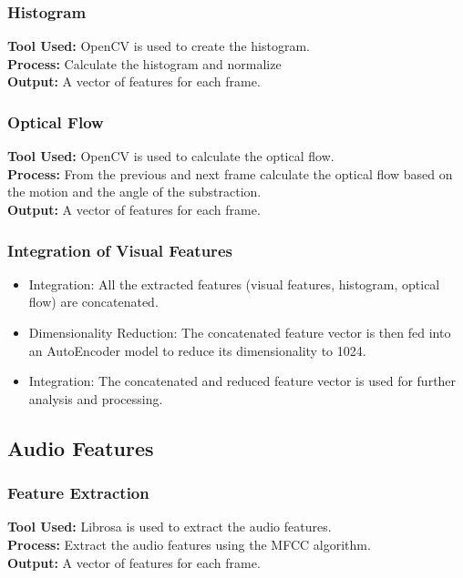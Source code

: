 \documentclass[conference]{IEEEtran}
\begin{document}
\subsubsection*{Histogram}
    \textbf{Tool Used:} OpenCV is used to create the histogram.\\
    \textbf{Process:} Calculate the histogram and normalize\\
    \textbf{Output:} A vector of features for each frame.
\\
\subsubsection*{Optical Flow}
    \textbf{Tool Used:} OpenCV is used to calculate the optical flow.\\
    \textbf{Process:} From the previous and next frame calculate the optical flow based on the motion and the angle of the substraction.\\
    \textbf{Output:} A vector of features for each frame.
\\
\subsubsection*{Integration of Visual Features}
    \begin{itemize}
        \item Integration: All the extracted features (visual features, histogram, optical flow) are concatenated.
        \item Dimensionality Reduction: The concatenated feature vector is then fed into an AutoEncoder model to reduce its dimensionality to 1024.
        \item Integration: The concatenated and reduced feature vector is used for further analysis and processing.
    \end{itemize}

\subsection*{Audio Features}
\subsubsection*{Feature Extraction}
    \textbf{Tool Used:} Librosa is used to extract the audio features.\\
    \textbf{Process:} Extract the audio features using the MFCC algorithm.\\
    \textbf{Output:} A vector of features for each frame.
\\
\end{document}
